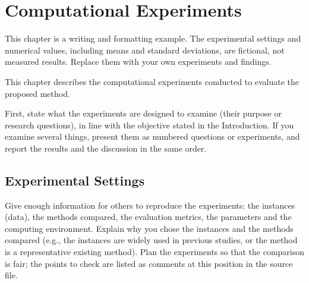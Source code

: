 \chapter{Computational Experiments}
\label{chap:experiments}

\begin{writingnote}
This chapter is a writing and formatting example. The experimental settings and numerical values,
including means and standard deviations, are fictional, not measured results.
Replace them with your own experiments and findings.
\end{writingnote}

This chapter describes the computational experiments conducted to evaluate the proposed method.
\begin{writingnote}
First, state what the experiments are designed to examine (their purpose or research questions),
in line with the objective stated in the Introduction.
If you examine several things, present them as numbered questions or experiments,
and report the results and the discussion in the same order.
\end{writingnote}

\section{Experimental Settings}
\label{sec:setup}

\begin{writingnote}
Give enough information for others to reproduce the experiments:
the instances (data), the methods compared, the evaluation metrics, the parameters and the computing environment.
Explain why you chose the instances and the methods compared
(e.g., the instances are widely used in previous studies, or the method is a representative existing method).
Plan the experiments so that the comparison is fair; the points to check are listed as comments at this position in the source file.
\end{writingnote}


